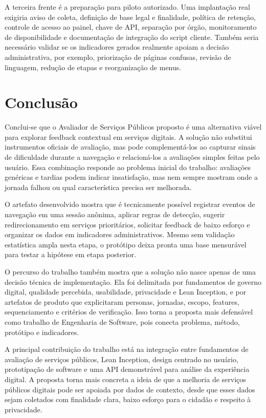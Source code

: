 A terceira frente é a preparação para piloto autorizado. Uma implantação real
exigiria aviso de coleta, definição de base legal e finalidade, política de
retenção, controle de acesso ao painel, chave de API, separação por órgão,
monitoramento de disponibilidade e documentação de integração do script cliente.
Também seria necessário validar se os indicadores gerados realmente apoiam a
decisão administrativa, por exemplo, priorização de páginas confusas, revisão de
linguagem, redução de etapas e reorganização de menus.

\section{Conclusão}

Conclui-se que o Avaliador de Serviços Públicos proposto é uma alternativa
viável para explorar feedback contextual em serviços digitais. A solução não
substitui instrumentos oficiais de avaliação, mas pode complementá-los ao
capturar sinais de dificuldade durante a navegação e relacioná-los a avaliações
simples feitas pelo usuário. Essa combinação responde ao problema inicial do
trabalho: avaliações genéricas e tardias podem indicar insatisfação, mas nem
sempre mostram onde a jornada falhou ou qual característica precisa ser
melhorada.

O artefato desenvolvido mostra que é tecnicamente possível registrar eventos de
navegação em uma sessão anônima, aplicar regras de detecção, sugerir
redirecionamento em serviços prioritários, solicitar feedback de baixo esforço e
organizar os dados em indicadores administrativos. Mesmo sem validação
estatística ampla nesta etapa, o protótipo deixa pronta uma base mensurável para
testar a hipótese em etapa posterior.

O percurso do trabalho também mostra que a solução não nasce apenas de uma
decisão técnica de implementação. Ela foi delimitada por fundamentos de governo
digital, qualidade percebida, usabilidade, privacidade e Lean Inception, e por
artefatos de produto que explicitaram personas, jornadas, escopo, features,
sequenciamento e critérios de verificação. Isso torna a proposta mais defensável
como trabalho de Engenharia de Software, pois conecta problema, método, protótipo
e indicadores.

A principal contribuição do trabalho está na integração entre fundamentos de
avaliação de serviços públicos, Lean Inception, design centrado no usuário,
prototipação de software e uma API demonstrável para análise da experiência
digital. A proposta torna mais concreta a ideia de que a melhoria de serviços
públicos digitais pode ser apoiada por dados de contexto, desde que esses dados
sejam coletados com finalidade clara, baixo esforço para o cidadão e respeito à
privacidade.
